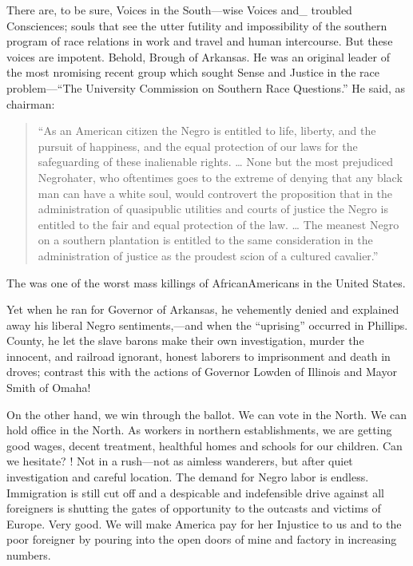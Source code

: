 \documentclass[letterpaper,10pt,english]{jupyterBook}
\begin{document}
\sphinxAtStartPar
There are, to be sure, Voices in the South—wise Voices and\_ troubled Consciences; souls that see the utter futility and impossibility of the southern program of race relations in work and travel and human intercourse. But these voices are impotent. Behold, Brough of Arkansas. He was an original leader of the most nromising recent group which sought Sense and Justice in the race problem—“The University Commission on Southern Race Questions.” He said, as chairman:
\begin{quote}

\sphinxAtStartPar
“As an American citizen the Negro is entitled to life, liberty, and the pursuit of happiness, and the equal protection of our laws for the safeguarding of these inalienable rights. … None but the most prejudiced Negro\sphinxhyphen{}hater, who oftentimes goes to the extreme of denying that any black man can have a white soul, would controvert the proposition that in the administration of quasi\sphinxhyphen{}public utilities and courts of justice the Negro is entitled to the fair and equal protection of the law. … The meanest Negro on a southern plantation is entitled to the same consideration in the administration of justice as the proudest scion of a cultured cavalier.”
\end{quote}

\begin{sphinxShadowBox}
\sphinxstylesidebartitle{}

\sphinxAtStartPar
The  was one of the worst mass killings of African\sphinxhyphen{}Americans in the United States.
\end{sphinxShadowBox}

\sphinxAtStartPar
Yet when he ran for Governor of Arkansas, he vehemently denied and explained away his liberal Negro sentiments,—and when the “uprising” occurred in Phillips. County, he let the slave barons make their own investigation, murder the innocent, and railroad ignorant, honest laborers to imprisonment and death in droves; contrast this with the actions of Governor Lowden of Illinois and Mayor Smith of Omaha!

\sphinxAtStartPar
On the other hand, we win through the ballot. We can vote in the North. We can hold office in the North. As workers in northern establishments, we are getting good wages, decent treatment, healthful homes and schools for our children. Can we hesitate? ! Not in a rush—not as aimless wanderers, but after quiet investigation and careful location. The demand for Negro labor is endless. Immigration is still cut off and a despicable and indefensible drive against all foreigners is shutting the gates of opportunity to the outcasts and victims of Europe. Very good. We will make America pay for her Injustice to us and to the poor foreigner by pouring into the open doors of mine and factory in increasing numbers.
\end{document}
